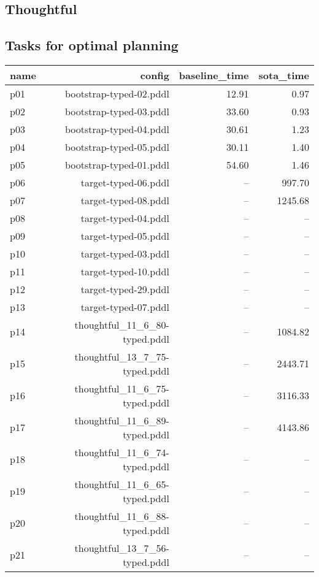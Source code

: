 \documentclass{article}
\begin{document}
                \newpage \subsection{Thoughtful}
                    \subsection*{Tasks for optimal planning}
                    
                            \begin{center}
                            \scriptsize
                            \begin{tabular}{@{}l|r|r|r@{}}
                            name & config & baseline\_time & sota\_time\\\midrule
                              p01& bootstrap-typed-02.pddl&12.91&0.97\\
  p02& bootstrap-typed-03.pddl&33.60&0.93\\
  p03& bootstrap-typed-04.pddl&30.61&1.23\\
  p04& bootstrap-typed-05.pddl&30.11&1.40\\
  p05& bootstrap-typed-01.pddl&54.60&1.46\\
  p06& target-typed-06.pddl&--&997.70\\
  p07& target-typed-08.pddl&--&1245.68\\
  p08& target-typed-04.pddl&--&--\\
  p09& target-typed-05.pddl&--&--\\
  p10& target-typed-03.pddl&--&--\\
  p11& target-typed-10.pddl&--&--\\
  p12& target-typed-29.pddl&--&--\\
  p13& target-typed-07.pddl&--&--\\
  p14& thoughtful\_11\_6\_80-typed.pddl&--&1084.82\\
  p15& thoughtful\_13\_7\_75-typed.pddl&--&2443.71\\
  p16& thoughtful\_11\_6\_75-typed.pddl&--&3116.33\\
  p17& thoughtful\_11\_6\_89-typed.pddl&--&4143.86\\
  p18& thoughtful\_11\_6\_74-typed.pddl&--&--\\
  p19& thoughtful\_11\_6\_65-typed.pddl&--&--\\
  p20& thoughtful\_11\_6\_88-typed.pddl&--&--\\
  p21& thoughtful\_13\_7\_56-typed.pddl&--&--\\

\end{tabular}
\end{center}
\end{document}
